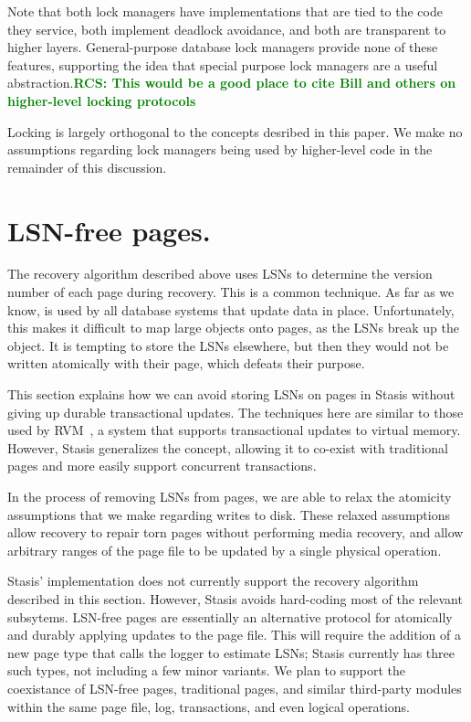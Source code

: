 \documentclass[letterpaper,twocolumn,10pt]{article}
\newcommand{\yad}{Stasis\xspace}
\newcommand{\yads}{Stasis'\xspace}
\newcommand{\rcs}[1]{\textcolor{green}{\bf RCS: #1}}
\begin{document}
Note that both lock managers have implementations that are tied to the
code they service, both implement deadlock avoidance, and both are
transparent to higher layers.  General-purpose database lock managers
provide none of these features, supporting the idea that special
purpose lock managers are a useful abstraction.\rcs{This would be a
good place to cite Bill and others on higher-level locking protocols}

Locking is largely orthogonal to the concepts desribed in this paper.
We make no assumptions regarding lock managers being used by higher-level code in the remainder of this discussion.



\section{LSN-free pages.}
\label{sec:lsn-free}
The recovery algorithm described above uses LSNs to determine the
version number of each page during recovery.  This is a common
technique.  As far as we know, is used by all database systems that
update data in place.  Unfortunately, this makes it difficult to map
large objects onto pages, as the LSNs break up the object.  It
is tempting to store the LSNs elsewhere, but then they would not be
written atomically with their page, which defeats their purpose.

This section explains how we can avoid storing LSNs on pages in \yad
without giving up durable transactional updates.  The techniques here
are similar to those used by RVM~\cite{lrvm}, a system that supports
transactional updates to virtual memory.  However, \yad generalizes
the concept, allowing it to co-exist with traditional pages and more easily
support concurrent transactions.

In the process of removing LSNs from pages, we
are able to relax the atomicity assumptions that we make regarding
writes to disk.  These relaxed assumptions allow recovery to repair
torn pages without performing media recovery, and allow arbitrary
ranges of the page file to be updated by a single physical operation.

\yads implementation does not currently support the recovery algorithm
described in this section.  However, \yad avoids hard-coding most of
the relevant subsytems.  LSN-free pages are essentially an alternative
protocol for atomically and durably applying updates to the page file.
This will require the addition of a new page type that calls the logger to estimate LSNs; \yad currently has
three such types, not including a few minor variants. We plan
to support the coexistance of LSN-free pages, traditional
pages, and similar third-party modules within the same page file, log,
transactions, and even logical operations.
\end{document}
